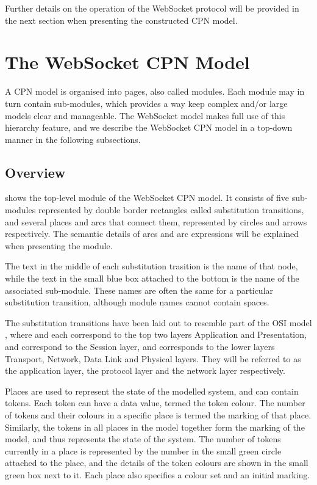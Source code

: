 Further details on the operation of the WebSocket protocol will be provided in
the next section when presenting the constructed CPN model.

\section{The WebSocket CPN Model} \label{sec:ws_cpn_model}

A CPN model is organised into pages, also called modules. Each module may in
turn contain sub-modules, which provides a way keep complex and/or large models
clear and manageable. The WebSocket model makes full use of this
hierarchy feature, and we describe the WebSocket CPN model in a top-down
manner in the following subsections.

\subsection{Overview}

	
	 shows the top-level  module of the
	WebSocket CPN model. It consists of five sub-modules represented by double
	border rectangles called substitution transitions, and several places
	and arcs that connect them, represented by circles and arrows respectively. 
	The semantic details of arcs and arc expressions will be explained when
	presenting the  module.
	
	The text in the middle of each substitution trasition is the name of that node,
	while the text in the small blue box attached to the bottom is the name of the
	associated sub-module. These names are often the same for a particular
	substitution transition, although module names cannot contain spaces.

	The substitution transitions have been laid out to resemble part of the OSI
	model \cite{osi7}, where  and  each correspond to the top two layers Application and
	Presentation,  and 
	correspond to the Session layer, and  corresponds to the
	lower layers Transport, Network, Data Link and Physical layers. They will be
	referred to as the application layer, the protocol layer and the network layer
	respectively.
	
	Places are used to represent the state of the modelled system, and can contain
	tokens. Each token can have a data value, termed the token colour. The number
	of tokens and their colours in a specific place is termed the marking of that
	place. Similarly, the tokens in all places in the model together form the 
	marking of the model, and thus represents the state of the system. The number
	of tokens currently in a place is represented by the number in the small green
	circle attached to the place, and the details of the token colours are shown in
	the small green box next to it. Each place also specifies a colour set
	and an initial marking.
	
